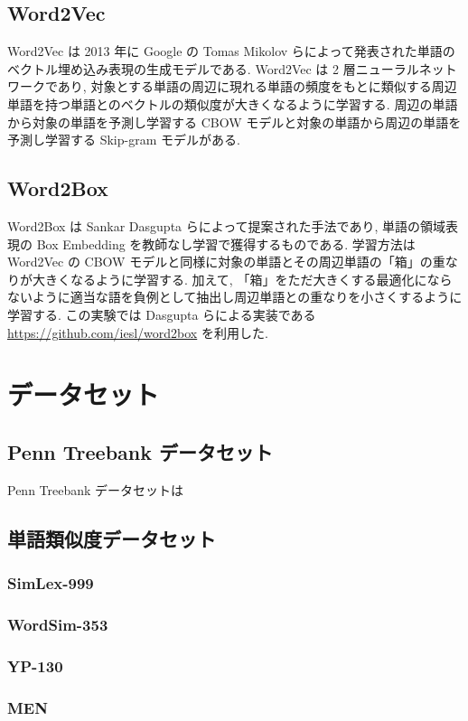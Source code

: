 \documentclass[twocolumn]{jarticle}     %
\begin{document}
\subsection{Word2Vec}
Word2Vec \cite{word2vec} は 2013 年に Google の Tomas Mikolov らによって発表された単語のベクトル埋め込み表現の生成モデルである. 
Word2Vec は 2 層ニューラルネットワークであり, 対象とする単語の周辺に現れる単語の頻度をもとに類似する周辺単語を持つ単語とのベクトルの類似度が大きくなるように学習する. 
周辺の単語から対象の単語を予測し学習する CBOW モデルと対象の単語から周辺の単語を予測し学習する Skip-gram モデルがある.

\subsection{Word2Box}
Word2Box\cite{dasgupta-etal-2022-word2box} は Sankar Dasgupta らによって提案された手法であり, 単語の領域表現の Box Embedding を教師なし学習で獲得するものである. 
学習方法は Word2Vec の CBOW モデルと同様に対象の単語とその周辺単語の「箱」の重なりが大きくなるように学習する. 
加えて, 「箱」をただ大きくする最適化にならないように適当な語を負例として抽出し周辺単語との重なりを小さくするように学習する. 
この実験では Dasgupta らによる実装である \url{https://github.com/iesl/word2box} を利用した. 

\section{データセット}
\subsection{Penn Treebank データセット}
Penn Treebank データセットは

\subsection{単語類似度データセット}
\subsubsection{SimLex-999}
\subsubsection{WordSim-353}
\subsubsection{YP-130}
\subsubsection{MEN}
\end{document}
